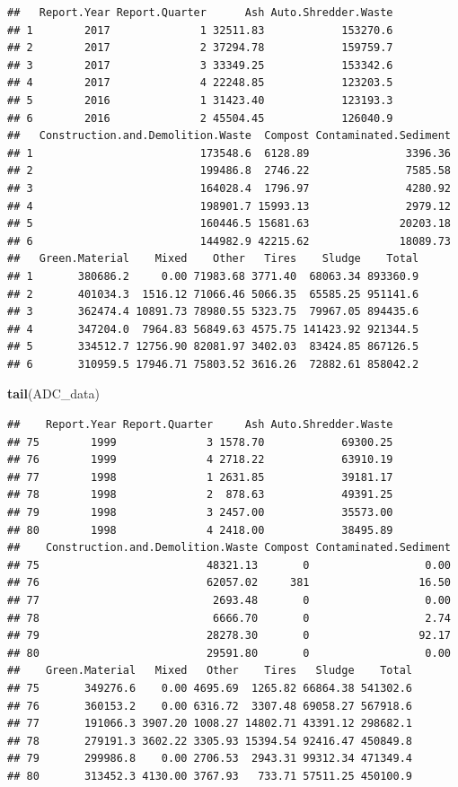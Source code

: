 \documentclass[12pt,]{article}
\newenvironment{Shaded}{\begin{snugshade}}{\end{snugshade}}
\newcommand{\KeywordTok}[1]{\textcolor[rgb]{0.13,0.29,0.53}{\textbf{#1}}}
\newcommand{\NormalTok}[1]{#1}
\begin{document}
\begin{verbatim}
##   Report.Year Report.Quarter      Ash Auto.Shredder.Waste
## 1        2017              1 32511.83            153270.6
## 2        2017              2 37294.78            159759.7
## 3        2017              3 33349.25            153342.6
## 4        2017              4 22248.85            123203.5
## 5        2016              1 31423.40            123193.3
## 6        2016              2 45504.45            126040.9
##   Construction.and.Demolition.Waste  Compost Contaminated.Sediment
## 1                          173548.6  6128.89               3396.36
## 2                          199486.8  2746.22               7585.58
## 3                          164028.4  1796.97               4280.92
## 4                          198901.7 15993.13               2979.12
## 5                          160446.5 15681.63              20203.18
## 6                          144982.9 42215.62              18089.73
##   Green.Material    Mixed    Other   Tires    Sludge    Total
## 1       380686.2     0.00 71983.68 3771.40  68063.34 893360.9
## 2       401034.3  1516.12 71066.46 5066.35  65585.25 951141.6
## 3       362474.4 10891.73 78980.55 5323.75  79967.05 894435.6
## 4       347204.0  7964.83 56849.63 4575.75 141423.92 921344.5
## 5       334512.7 12756.90 82081.97 3402.03  83424.85 867126.5
## 6       310959.5 17946.71 75803.52 3616.26  72882.61 858042.2
\end{verbatim}

\begin{Shaded}
\begin{Highlighting}[]
\KeywordTok{tail}\NormalTok{(ADC_data)}
\end{Highlighting}
\end{Shaded}

\begin{verbatim}
##    Report.Year Report.Quarter     Ash Auto.Shredder.Waste
## 75        1999              3 1578.70            69300.25
## 76        1999              4 2718.22            63910.19
## 77        1998              1 2631.85            39181.17
## 78        1998              2  878.63            49391.25
## 79        1998              3 2457.00            35573.00
## 80        1998              4 2418.00            38495.89
##    Construction.and.Demolition.Waste Compost Contaminated.Sediment
## 75                          48321.13       0                  0.00
## 76                          62057.02     381                 16.50
## 77                           2693.48       0                  0.00
## 78                           6666.70       0                  2.74
## 79                          28278.30       0                 92.17
## 80                          29591.80       0                  0.00
##    Green.Material   Mixed   Other    Tires   Sludge    Total
## 75       349276.6    0.00 4695.69  1265.82 66864.38 541302.6
## 76       360153.2    0.00 6316.72  3307.48 69058.27 567918.6
## 77       191066.3 3907.20 1008.27 14802.71 43391.12 298682.1
## 78       279191.3 3602.22 3305.93 15394.54 92416.47 450849.8
## 79       299986.8    0.00 2706.53  2943.31 99312.34 471349.4
## 80       313452.3 4130.00 3767.93   733.71 57511.25 450100.9
\end{verbatim}
\end{document}
